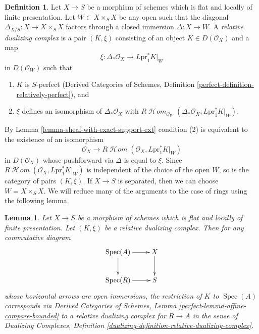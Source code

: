 \documentclass{stacks-project}
\theoremstyle{plain}
\newtheorem{lemma}[subsection]{Lemma}
\theoremstyle{definition}
\newtheorem{definition}[subsection]{Definition}
\theoremstyle{remark}
\numberwithin{equation}{subsection}
\def\Spec{\mathop{\mathrm{Spec}}}
\def\SheafHom{\mathop{\mathcal{H}\!\mathit{om}}\nolimits}
\begin{document}
\begin{definition}
\label{definition-relative-dualizing-complex}
Let $X \to S$ be a morphism of schemes which is flat and
locally of finite presentation. Let $W \subset X \times_S X$
be any open such that the diagonal $\Delta_{X/S} : X \to X \times_S X$
factors through a closed immersion $\Delta : X \to W$.
A {\it relative dualizing complex} is a
pair $(K, \xi)$ consisting of an object $K \in D(\mathcal{O}_X)$
and a map
$$
\xi : \Delta_*\mathcal{O}_X \longrightarrow L\text{pr}_1^*K|_W
$$
in $D(\mathcal{O}_W)$ such that
\begin{enumerate}
\item $K$ is $S$-perfect (Derived Categories of Schemes, Definition
\ref{perfect-definition-relatively-perfect}), and
\item $\xi$ defines an isomorphism of $\Delta_*\mathcal{O}_X$
with
$R\SheafHom_{\mathcal{O}_W}(
\Delta_*\mathcal{O}_X, L\text{pr}_1^*K|_W)$.
\end{enumerate}
\end{definition}

\noindent
By Lemma \ref{lemma-sheaf-with-exact-support-ext} condition (2)
is equivalent to the existence of an isomorphism
$$
\mathcal{O}_X \longrightarrow
R\SheafHom(\mathcal{O}_X, L\text{pr}_1^*K|_W)
$$
in $D(\mathcal{O}_X)$ whose pushforward via $\Delta$ is equal to $\xi$.
Since $R\SheafHom(\mathcal{O}_X, L\text{pr}_1^*K|_W)$ is independent
of the choice of the open $W$, so is the category of pairs $(K, \xi)$.
If $X \to S$ is separated, then we can choose $W = X \times_S X$.
We will reduce many of the arguments to the case of rings
using the following lemma.

\begin{lemma}
\label{lemma-relative-dualizing-complex-algebra}
Let $X \to S$ be a morphism of schemes which is flat and
locally of finite presentation. Let $(K, \xi)$ be a relative
dualizing complex. Then for any commutative diagram
$$
\xymatrix{
\Spec(A) \ar[d] \ar[r] & X \ar[d] \\
\Spec(R) \ar[r] & S
}
$$
whose horizontal arrows are open immersions, the
restriction of $K$ to $\Spec(A)$ corresponds via
Derived Categories of Schemes, Lemma
\ref{perfect-lemma-affine-compare-bounded}
to a relative dualizing complex for $R \to A$
in the sense of Dualizing Complexes, Definition
\ref{dualizing-definition-relative-dualizing-complex}.
\end{lemma}
\end{document}
